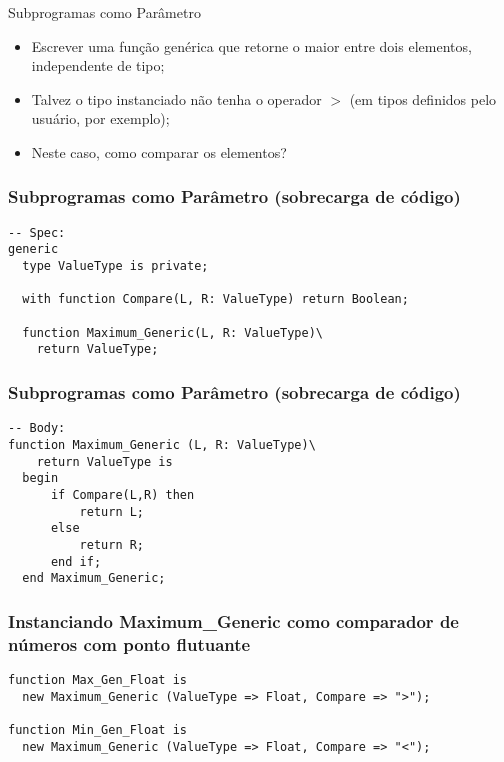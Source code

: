 \documentclass{beamer}
\begin{document}
    \begin{frame}{Subprogramas como Parâmetro}
        \begin{itemize}
            \item<1-> Escrever uma função genérica que retorne o maior entre
            dois elementos, independente de tipo;

            \item<2-> Talvez o tipo instanciado não tenha o operador $>$ (em
            tipos definidos pelo usuário, por exemplo);

            \item<3-> Neste caso, como comparar os elementos?
        \end{itemize}
    \end{frame}

    \begin{frame}[containsverbatim]
        \frametitle{Subprogramas como Parâmetro (sobrecarga de código)}
        \begin{verbatim}
-- Spec:
generic
  type ValueType is private;

  with function Compare(L, R: ValueType) return Boolean;

  function Maximum_Generic(L, R: ValueType)\
    return ValueType;
        \end{verbatim}
    \end{frame}

    \begin{frame}[containsverbatim]
        \frametitle{Subprogramas como Parâmetro (sobrecarga de código)}
        \begin{verbatim}
-- Body:
function Maximum_Generic (L, R: ValueType)\
    return ValueType is
  begin
      if Compare(L,R) then
          return L;
      else
          return R;
      end if;
  end Maximum_Generic;
        \end{verbatim}
    \end{frame}

    \begin{frame}[containsverbatim]
        \frametitle{Instanciando Maximum\_Generic como comparador de números com
        ponto flutuante}
        \begin{verbatim}
function Max_Gen_Float is
  new Maximum_Generic (ValueType => Float, Compare => ">");

function Min_Gen_Float is
  new Maximum_Generic (ValueType => Float, Compare => "<");
        \end{verbatim}
    \end{frame}
\end{document}
